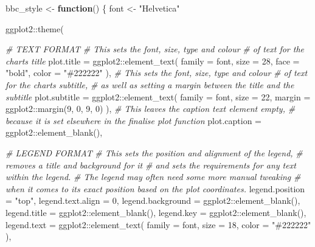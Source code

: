 \documentclass[
]{book}
\newenvironment{Shaded}{\begin{snugshade}}{\end{snugshade}}
\newcommand{\AttributeTok}[1]{\textcolor[rgb]{0.77,0.63,0.00}{#1}}
\newcommand{\CommentTok}[1]{\textcolor[rgb]{0.56,0.35,0.01}{\textit{#1}}}
\newcommand{\ControlFlowTok}[1]{\textcolor[rgb]{0.13,0.29,0.53}{\textbf{#1}}}
\newcommand{\DecValTok}[1]{\textcolor[rgb]{0.00,0.00,0.81}{#1}}
\newcommand{\FunctionTok}[1]{\textcolor[rgb]{0.00,0.00,0.00}{#1}}
\newcommand{\NormalTok}[1]{#1}
\newcommand{\OtherTok}[1]{\textcolor[rgb]{0.56,0.35,0.01}{#1}}
\newcommand{\SpecialCharTok}[1]{\textcolor[rgb]{0.00,0.00,0.00}{#1}}
\newcommand{\StringTok}[1]{\textcolor[rgb]{0.31,0.60,0.02}{#1}}
\begin{document}
\begin{Shaded}
\begin{Highlighting}[]
\NormalTok{bbc\_style }\OtherTok{\textless{}{-}} \ControlFlowTok{function}\NormalTok{() \{}
\NormalTok{  font }\OtherTok{\textless{}{-}} \StringTok{"Helvetica"}
  
\NormalTok{  ggplot2}\SpecialCharTok{::}\FunctionTok{theme}\NormalTok{(}
    
    \CommentTok{\# TEXT FORMAT}
    \CommentTok{\# This sets the font, size, type and colour }
    \CommentTok{\# of text for the chart\textquotesingle{}s title}
    \AttributeTok{plot.title =}\NormalTok{ ggplot2}\SpecialCharTok{::}\FunctionTok{element\_text}\NormalTok{(}
      \AttributeTok{family =}\NormalTok{ font,}
      \AttributeTok{size =} \DecValTok{28}\NormalTok{,}
      \AttributeTok{face =} \StringTok{"bold"}\NormalTok{,}
      \AttributeTok{color =} \StringTok{"\#222222"}
\NormalTok{    ),}
    \CommentTok{\# This sets the font, size, type and colour}
    \CommentTok{\# of text for the chart\textquotesingle{}s subtitle,}
    \CommentTok{\# as well as setting a margin between the title and the subtitle}
    \AttributeTok{plot.subtitle =}\NormalTok{ ggplot2}\SpecialCharTok{::}\FunctionTok{element\_text}\NormalTok{(}
      \AttributeTok{family =}\NormalTok{ font,}
      \AttributeTok{size =} \DecValTok{22}\NormalTok{,}
      \AttributeTok{margin =}\NormalTok{ ggplot2}\SpecialCharTok{::}\FunctionTok{margin}\NormalTok{(}\DecValTok{9}\NormalTok{, }\DecValTok{0}\NormalTok{, }\DecValTok{9}\NormalTok{, }\DecValTok{0}\NormalTok{)}
\NormalTok{    ),}
    \CommentTok{\# This leaves the caption text element empty, }
    \CommentTok{\# because it is set elsewhere in the finalise plot function}
    \AttributeTok{plot.caption =}\NormalTok{ ggplot2}\SpecialCharTok{::}\FunctionTok{element\_blank}\NormalTok{(),}
    
    \CommentTok{\# LEGEND FORMAT}
    \CommentTok{\# This sets the position and alignment of the legend, }
    \CommentTok{\# removes a title and background for it}
    \CommentTok{\# and sets the requirements for any text within the legend.}
    \CommentTok{\# The legend may often need some more manual tweaking }
    \CommentTok{\# when it comes to its exact position based on the plot coordinates.}
    \AttributeTok{legend.position =} \StringTok{"top"}\NormalTok{,}
    \AttributeTok{legend.text.align =} \DecValTok{0}\NormalTok{,}
    \AttributeTok{legend.background =}\NormalTok{ ggplot2}\SpecialCharTok{::}\FunctionTok{element\_blank}\NormalTok{(),}
    \AttributeTok{legend.title =}\NormalTok{ ggplot2}\SpecialCharTok{::}\FunctionTok{element\_blank}\NormalTok{(),}
    \AttributeTok{legend.key =}\NormalTok{ ggplot2}\SpecialCharTok{::}\FunctionTok{element\_blank}\NormalTok{(),}
    \AttributeTok{legend.text =}\NormalTok{ ggplot2}\SpecialCharTok{::}\FunctionTok{element\_text}\NormalTok{(}
      \AttributeTok{family =}\NormalTok{ font,}
      \AttributeTok{size =} \DecValTok{18}\NormalTok{,}
      \AttributeTok{color =} \StringTok{"\#222222"}
\NormalTok{    ),}
    

\end{Highlighting}
\end{Shaded}
\end{document}
